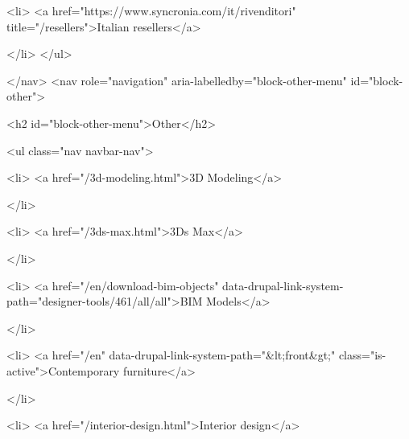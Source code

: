     

                    <li>
                  <a href="https://www.syncronia.com/it/rivenditori" title="/resellers">Italian resellers</a>
                    
            </li>
        </ul>
  

  </nav>
<nav role="navigation" aria-labelledby="block-other-menu" id="block-other">
      
  <h2 id="block-other-menu">Other</h2>
  

        
              <ul class="nav navbar-nav">
            
                   
            
      
            
    

                    <li>
                  <a href="/3d-modeling.html">3D Modeling</a>
                    
            </li>
        
                   
            
      
            
    

                    <li>
                  <a href="/3ds-max.html">3Ds Max</a>
                    
            </li>
        
                   
            
      
            
    

                    <li>
                  <a href="/en/download-bim-objects" data-drupal-link-system-path="designer-tools/461/all/all">BIM Models</a>
                    
            </li>
        
                   
            
      
            
    

                    <li>
                  <a href="/en" data-drupal-link-system-path="&lt;front&gt;" class="is-active">Contemporary furniture</a>
                    
            </li>
        
                   
            
      
            
    

                    <li>
                  <a href="/interior-design.html">Interior design</a>
                    
